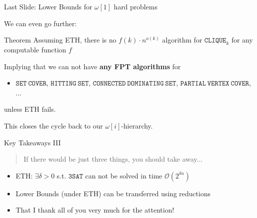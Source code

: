 \begin{frame}[c]{Last Slide: Lower Bounds for $\omega[1]$ hard problems}

We can even go further:

\begin{block}{Theorem \cite{clique}}Assuming ETH, there is no $f(k) \cdot n^{o(k)}$ algorithm for $\mathtt{CLIQUE}_k$ for any computable function $f$
\end{block}

Implying that we can not have \textbf{any FPT algorithms} for
\begin{itemize}
    \item $\mathtt{SET~COVER}$, $\mathtt{HITTING~SET}$, $\mathtt{CONNECTED~DOMINATING~SET}$, $\mathtt{PARTIAL~VERTEX~COVER}$, $\mathtt{...}$
\end{itemize}
unless ETH fails.

This closes the cycle back to our $\omega[i]$-hierarchy.

\end{frame}


\begin{frame}[c]{Key Takeaways III}
\begin{center}
\begin{quote}
    If there would be just three things, you should take away...
\end{quote}
\begin{itemize}

\item ETH: $\exists \delta > 0$ s.t. $\mathtt{3SAT}$ can not be solved in time $\mathcal{O}(2^{\delta n })$
\item Lower Bounds (under ETH) can be transferred using reductions
\item That I thank all of you very much for the attention!
\end{itemize}
\end{center}
\end{frame}
